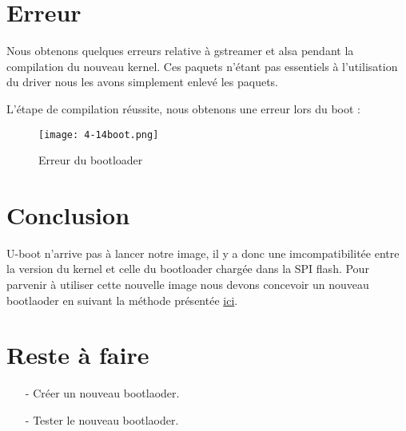 \section{Erreur}
Nous obtenons quelques erreurs relative à gstreamer et alsa pendant la compilation du nouveau kernel.
Ces paquets n'étant pas essentiels à l'utilisation du driver nous les avons simplement enlevé les paquets.

L'étape de compilation réussite, nous obtenons une erreur lors du boot :
\begin{figure}[th]
  \centering
  \texttt{[image: 4-14boot.png]}
  \decoRule
  \caption{Erreur du bootloader}  \label{fig:planning}
\end{figure}

\section{Conclusion}

U-boot n'arrive pas à lancer notre image, il y a donc une imcompatibilitée entre 
la version du kernel et celle du bootloader chargée dans la SPI flash. Pour parvenir
à utiliser cette nouvelle image nous devons concevoir un nouveau bootlaoder en suivant
la méthode présentée
\href{http://www.imx6rex.com/open-rex/software/yocto-uboot-how-to-add-support-for-a-custom-board/}
{ici}.
 
\section{Reste à faire}
\begin{itemize}
\item[-] Créer un nouveau bootlaoder.
\item[-] Tester le nouveau bootlaoder.
\end{itemize}

